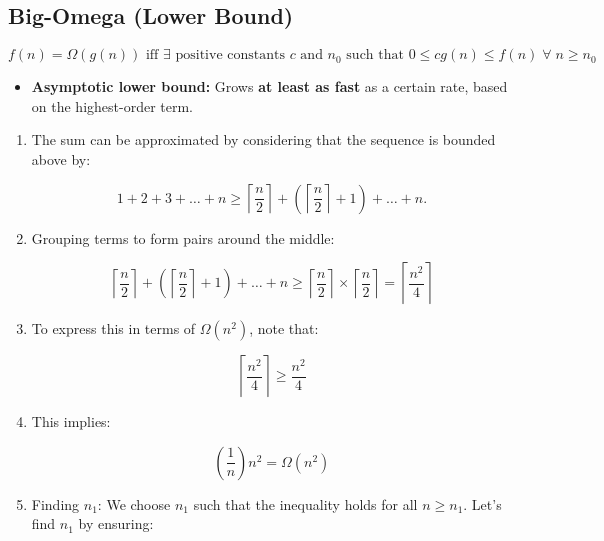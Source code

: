 \subsection{Big-Omega (Lower Bound)}
    \begin{definition}
        $ f(n) = \Omega(g(n)) \text{ iff } \exists \text{ positive constants } c \text{ and } n_0 \text{ such that } 0 \leq c g(n) \leq f(n) \; \forall \; n \geq n_0 $
        \begin{itemize}
            \item \textbf{Asymptotic lower bound:} Grows \textbf{at least as fast} as a certain rate, based on the highest-order term.
        \end{itemize}
    \end{definition}

    \begin{example}
        \begin{enumerate}
            \item The sum can be approximated by considering that the sequence is bounded above by:
        
            \[
            1 + 2 + 3 + \ldots + n \geq \left\lceil \frac{n}{2} \right\rceil + \left( \left\lceil \frac{n}{2} \right\rceil + 1 \right) + \ldots + n.
            \]
        
            \item Grouping terms to form pairs around the middle:
        
            \[
                \left\lceil \frac{n}{2} \right\rceil + \left( \left\lceil \frac{n}{2} \right\rceil + 1 \right) + \ldots + n \geq \left\lceil \frac{n}{2} \right\rceil \times \left\lceil \frac{n}{2} \right\rceil = \left\lceil \frac{n^2}{4} \right\rceil
            \]
        
            \item To express this in terms of \( \Omega(n^2) \), note that:
        
            \[
            \left\lceil \frac{n^2}{4} \right\rceil \geq \frac{n^2}{4}
            \]
        
            \item This implies:
        
            \[
            \left( \frac{1}{n} \right)n^2 = \Omega(n^2)
            \]
        
            \item Finding \( n_1 \): We choose \( n_1 \) such that the inequality holds for all \( n \geq n_1 \). Let's find \( n_1 \) by ensuring:
        

\end{enumerate}
\end{example}
